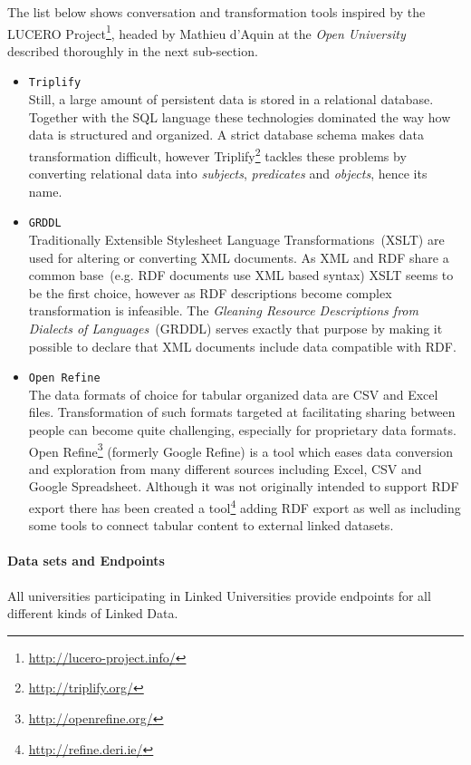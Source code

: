 \documentclass{article}
\begin{document}
The list below shows conversation and transformation tools inspired by the LUCERO Project\footnote{\url{http://lucero-project.info/}}, headed by 
Mathieu d'Aquin at the \textit{Open University}~\cite{inproceedings:open_university} described thoroughly in the next sub-section.
\begin{itemize}
	\item \texttt{Triplify}~\\
		Still, a large amount of persistent data is stored in a relational database. Together with the SQL language these technologies dominated the way how data is structured and organized. A strict database schema makes data transformation difficult, however Triplify\footnote{\url{http://triplify.org/}} tackles these problems by converting relational data into \textit{subjects}, \textit{predicates} and \textit{objects}, hence its name. 
	\item \texttt{GRDDL}~\\
		Traditionally Extensible Stylesheet Language Transformations~(XSLT) are used for altering or converting XML documents. As XML and RDF share a common base~(e.g. RDF documents use XML based syntax) XSLT seems to be the first choice, however as RDF descriptions become complex transformation is infeasible. The \textit{Gleaning Resource Descriptions from Dialects of Languages}~(GRDDL)\cite{jour:grddl} serves exactly that purpose by making it possible to declare that XML documents include data compatible with RDF. 
	\item \texttt{Open Refine}~\\
		The data formats of choice for tabular organized data are CSV and Excel files. Transformation of such formats targeted at facilitating sharing between people can become quite challenging, especially for proprietary data formats. Open Refine\footnote{\url{http://openrefine.org/}} (formerly Google Refine) is a tool which eases data conversion and exploration from many different sources including Excel, CSV and Google Spreadsheet. Although it was not originally intended to support RDF export there has been created a tool\footnote{\url{http://refine.deri.ie/}} adding RDF export as well as including some tools to connect tabular content to external linked datasets. 
\end{itemize}


\paragraph{Data sets and Endpoints}
All universities participating in Linked Universities provide endpoints for all different kinds of Linked Data.
\end{document}
